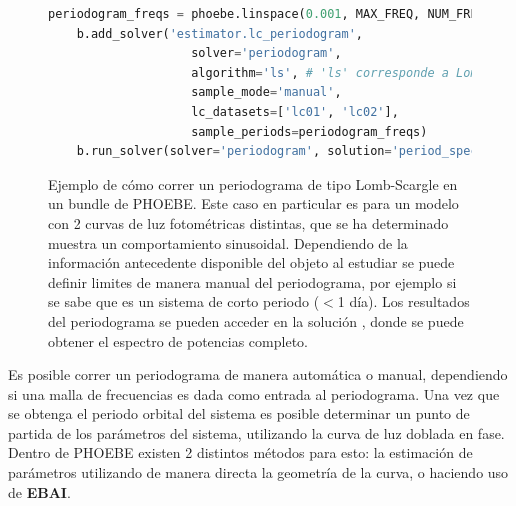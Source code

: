 \begin{figure}[!ht]
	\begin{lstlisting}[language=python, autogobble]
	periodogram_freqs = phoebe.linspace(0.001, MAX_FREQ, NUM_FREQS)
	b.add_solver('estimator.lc_periodogram', 
					solver='periodogram',
					algorithm='ls', # 'ls' corresponde a Lomb-Scargle, 'bls' a BLS
					sample_mode='manual',
					lc_datasets=['lc01', 'lc02'],
					sample_periods=periodogram_freqs)
	b.run_solver(solver='periodogram', solution='period_spectrum')
	\end{lstlisting}
	\caption{Ejemplo de cómo correr un periodograma de tipo
	Lomb-Scargle en un bundle de PHOEBE. Este caso en particular es para un
	modelo con 2 curvas de luz fotométricas distintas, que se ha determinado
	muestra un comportamiento sinusoidal. Dependiendo de la información
	antecedente disponible del objeto al estudiar se puede definir limites de
	manera manual del periodograma, por ejemplo si se sabe que es un sistema de
	corto periodo ($<$1 día). Los resultados del periodograma se pueden acceder en
	la solución , donde se puede obtener el espectro de
	potencias completo.}
\end{figure}

Es posible correr un periodograma de manera automática o manual, dependiendo si
una malla de frecuencias es dada como entrada al periodograma. Una vez que se
obtenga el periodo orbital del sistema es posible determinar un punto de partida
de los parámetros del sistema, utilizando la curva de luz doblada en fase.
Dentro de PHOEBE existen 2 distintos métodos para esto: la estimación de
parámetros utilizando de manera directa la geometría de la curva, o haciendo uso
de \textbf{EBAI}.

